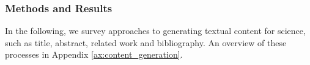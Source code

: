 \subsubsection{Methods and Results}


\iffalse
\noindent\textbf{Title Generation}
\begin{itemize}
    \item Abstract-to-title: \citet{chen-eger-2023-transformers}
    \item A2T: \url{https://www.researchgate.net/profile/Vishal-Lodhwal-2/publication/369741619_Survey_Paper_Automatic_Title_Generation_for_Text_with_RNN_and_Pre-trained_Transformer_Language_Model/links/642fd66e20f25554da158ea3/Survey-Paper-Automatic-Title-Generation-for-Text-with-RNN-and-Pre-trained-Transformer-Language-Model.pdf}
    \item A2T: \citet{mishra2021automatic}
    \item Title-2-abstract: \citet{wang-etal-2019-paperrobot} 
\end{itemize}
\fi 
In the following, we survey approaches to generating %
textual content for science, 
such as title, abstract, related work and bibliography. 
An overview of these processes  in Appendix \ref{ax:content_generation}. 

